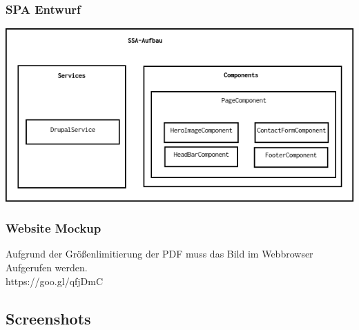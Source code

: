 \documentclass[11pt,a4paper]{article}
\begin{document}
\begin{appendices}
\subsubsection{SPA Entwurf}
\label{sec:espa}
\includegraphics[scale=0.7]{SSA}
\subsubsection{Website Mockup}
\label{sec:mockup}
\centering
Aufgrund der Größenlimitierung der PDF muss das Bild im Webbrowser Aufgerufen werden.\\
https://goo.gl/qfjDmC
\flushleft


\subsection{Screenshots}

\end{appendices}
\end{document}
